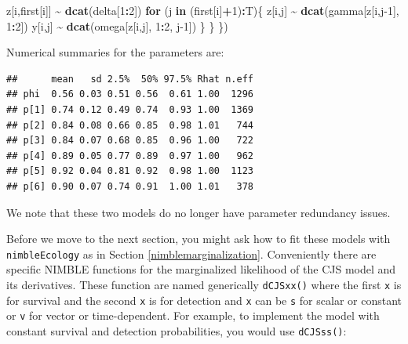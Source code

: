 \documentclass[
  12pt,
]{krantz}
\newenvironment{Shaded}{\begin{snugshade}}{\end{snugshade}}
\newcommand{\ControlFlowTok}[1]{\textcolor[rgb]{0.13,0.29,0.53}{\textbf{#1}}}
\newcommand{\DecValTok}[1]{\textcolor[rgb]{0.00,0.00,0.81}{#1}}
\newcommand{\FunctionTok}[1]{\textcolor[rgb]{0.13,0.29,0.53}{\textbf{#1}}}
\newcommand{\NormalTok}[1]{#1}
\newcommand{\SpecialCharTok}[1]{\textcolor[rgb]{0.81,0.36,0.00}{\textbf{#1}}}
\begin{document}
\begin{Shaded}
\begin{Highlighting}[]
\NormalTok{    z[i,first[i]] }\SpecialCharTok{\textasciitilde{}} \FunctionTok{dcat}\NormalTok{(delta[}\DecValTok{1}\SpecialCharTok{:}\DecValTok{2}\NormalTok{])}
    \ControlFlowTok{for}\NormalTok{ (j }\ControlFlowTok{in}\NormalTok{ (first[i]}\SpecialCharTok{+}\DecValTok{1}\NormalTok{)}\SpecialCharTok{:}\NormalTok{T)\{}
\NormalTok{      z[i,j] }\SpecialCharTok{\textasciitilde{}} \FunctionTok{dcat}\NormalTok{(gamma[z[i,j}\DecValTok{{-}1}\NormalTok{], }\DecValTok{1}\SpecialCharTok{:}\DecValTok{2}\NormalTok{])}
\NormalTok{      y[i,j] }\SpecialCharTok{\textasciitilde{}} \FunctionTok{dcat}\NormalTok{(omega[z[i,j], }\DecValTok{1}\SpecialCharTok{:}\DecValTok{2}\NormalTok{, j}\DecValTok{{-}1}\NormalTok{])}
\NormalTok{    \}}
\NormalTok{  \}}
\NormalTok{\})}
\end{Highlighting}
\end{Shaded}

Numerical summaries for the parameters are:

\begin{verbatim}
##      mean   sd 2.5%  50% 97.5% Rhat n.eff
## phi  0.56 0.03 0.51 0.56  0.61 1.00  1296
## p[1] 0.74 0.12 0.49 0.74  0.93 1.00  1369
## p[2] 0.84 0.08 0.66 0.85  0.98 1.01   744
## p[3] 0.84 0.07 0.68 0.85  0.96 1.00   722
## p[4] 0.89 0.05 0.77 0.89  0.97 1.00   962
## p[5] 0.92 0.04 0.81 0.92  0.98 1.00  1123
## p[6] 0.90 0.07 0.74 0.91  1.00 1.01   378
\end{verbatim}

We note that these two models do no longer have parameter redundancy issues.

Before we move to the next section, you might ask how to fit these models with \texttt{nimbleEcology} as in Section \ref{nimblemarginalization}. Conveniently there are specific NIMBLE functions for the marginalized likelihood of the CJS model and its derivatives. These function are named generically \texttt{dCJSxx()} where the first \texttt{x} is for survival and the second \texttt{x} is for detection and \texttt{x} can be \texttt{s} for scalar or constant or \texttt{v} for vector or time-dependent. For example, to implement the model with constant survival and detection probabilities, you would use \texttt{dCJSss()}:
\end{document}
